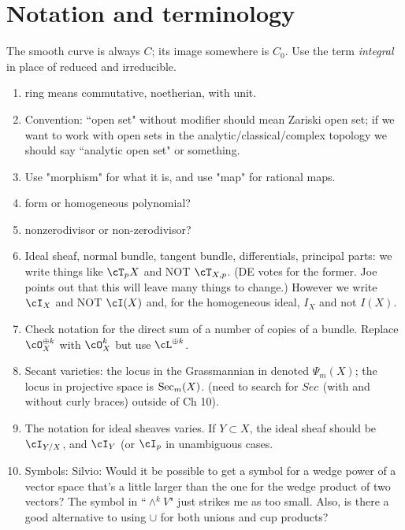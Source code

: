\documentclass[12pt, leqno]{book}
\begin{document}
\section{Notation and terminology}

The smooth curve is always $C$; its image somewhere is $C_0$. Use the term \emph{ integral} in place of
reduced and irreducible.

\begin{enumerate}
\item ring means commutative, noetherian, with unit.
\item Convention: ``open set" without modifier should mean Zariski open set; if we want to work with open sets in the analytic/classical/complex topology we should say ``analytic open set" or something.

\item Use "morphism" for what it is, and use "map" for rational maps.

 \item form or homogeneous polynomial?
 \item nonzerodivisor or non-zerodivisor?

\item Ideal sheaf, normal bundle, tangent bundle, differentials, principal parts: we write things like 
$\cT_{p}X$ and NOT $\cT_{X,p}$.  (DE votes for the former. Joe points out that
this will leave many things to change.) However  we write $\cI_{X}$ and NOT $\cI(X)$ and, for the homogeneous
ideal, $I_{X}$ and not $I(X)$.

\item Check notation for the direct sum of a number of copies of a bundle. Replace $\cO_{X}^{\oplus k}$ with $\cO_{X}^{k}$ but use 
$\cL^{\oplus k}$.

\item Secant varieties: the locus in the Grassmannian in denoted $\Psi_m(X)$; the locus in projective space is $\Sec_m(X)$. (need to search for $Sec_{}$ (with and without curly braces) outside of Ch 10).

\item The notation for ideal sheaves varies. If $Y \subset X$,  the ideal sheaf should be $\cI_{Y/X}$, and $\cI_{Y}$ (or $\cI_{p}$ in unambiguous cases.

\item Symbols: Silvio: Would it be possible to get a symbol for a wedge power of a vector space that's a little larger than the one for the wedge product of two vectors? The symbol in ``$\wedge^k V$" just strikes me as too small. Also, is there a good alternative to using $\cup$ for both unions and cup products?


\end{enumerate}
\end{document}
